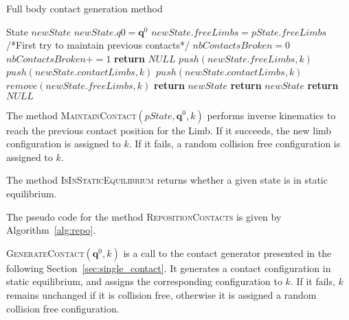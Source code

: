 \begin{algorithm}
\caption{Full body contact generation method} \label{interpolate}
	\begin{algorithmic}[1]
		\State State $newState$
		\State $newState.q0 = \mathbf{q}^0$
		\State $newState.freeLimbs = pState.freeLimbs$
		\State /*First try to maintain previous contacts*/
		\State $nbContactsBroken = 0$
				\State $nbContactsBroken += 1$
					\State \textbf{return} $NULL$
				\EndIf				
				\State $push(newState.freeLimbs,k)$
			\Else 					
				\State $push(newState.contactLimbs,k)$
			\EndIf
		\EndFor
				\State $push(newState.contactLimbs,k)$
				\State $remove(newState.freeLimbs,k)$		
				\State \textbf{return} $newState$
			\EndIf
		\EndFor
			\State \textbf{return} $newState$
		\Else
			\State \textbf{return} $NULL$
		\EndIf
	\EndFunction
\end{algorithmic}
\label{alg:pi}
\end{algorithm}

The method \textsc{MaintainContact}$(pState,\mathbf{q}^0,k)$ performs inverse kinematics to reach the previous contact position for the Limb.
If it succeeds, the new limb configuration is assigned to $k$. If it fails, a random collision free configuration is assigned to $k$.

The method \textsc{IsInStaticEquilibrium} returns whether a given state is in static equilibrium.

The pseudo code for the method \textsc{RepositionContacts} is given by Algorithm~\ref{alg:repo}.


\textsc{GenerateContact}$(\mathbf{q}^0,k)$ is a call to the contact generator presented in the following Section~\ref{sec:single_contact}.
 It generates a contact configuration in static equilibrium, and assigns the corresponding configuration to $k$.
If it fails, $k$ remains unchanged if it is collision free, otherwise it is assigned a random collision free configuration.



